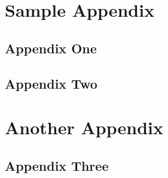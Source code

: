 \documentclass[phd,appendix,figures]{uithesis}
\begin{document}
\chapter{Sample Appendix}

\section{Appendix One}
\blindtext

\section{Appendix Two}
\blindtext

\chapter{Another Appendix}

\section{Appendix Three}
\blindtext



 
\end{document}
